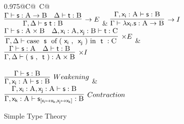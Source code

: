 \begin{figure}
	\centering
	\begin{tabularx}{0.975\textwidth}{@{}C@{~}C@{}}
		\\[1em]
		$\infer[\to E]{\Gamma, \Delta \vdash \term{s~t} : \prop B}{\Gamma \vdash \term{s} : \prop A \to \prop B & \Delta \vdash \term{t} : \prop B}$ 
		& 
		$\infer[\to I]{\Gamma \vdash \term{\lambda x_i.s} : \prop A \to \prop B}{\Gamma, \term{x_i}: \prop A \vdash \term{s}:\prop B}$\\[1em]
		$\infer[\times E]
			{\Gamma,\Delta \vdash
			 \cterm{case \term{s} of (\term{x_i}, \term{x_j}) in \term{t}} 
			 : \prop{C}}
			{\Gamma \vdash \term{s}: \prop A \times \prop B & 
			\Delta, \term{x_i}: \prop A , \term{x_j}: \prop B \vdash \term{t}: \prop{C}}$ 
		&
		$\infer[\times I]
			{\Gamma, \Delta \vdash \cterm{(\term{s}, \term{t})}: \prop{A} \times \prop{B}}
			{\Gamma \vdash \term{s}: \prop{A} & \Delta \vdash \term{t}:\prop{B}}$\\[1em]
		\\[1em]
		$\infer[\Weakening{}]
			{\Gamma, \term{x_i}: \prop{A} \vdash \term{s}: \prop{B}}
			{\Gamma \vdash \term{s}:\prop{B}} $ 
		&
		$\infer[\Contraction{}]
			{\Gamma, \term{x_k}: \prop{A} \vdash \term{s}_{[\term{x_i} \mapsto \term{x_k}, \term{x_j} \mapsto \term{x_k}]}:\prop{B}}
			{\Gamma,  \term{x_i}: \prop{A}, \term{x_j}: \prop{A} \vdash \term{s}: \prop{B}}$
		\end{tabularx}
	\caption{Simple Type Theory}
	\label{figure:simple_type_theory}
\end{figure}

